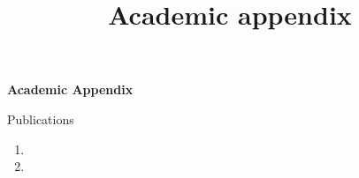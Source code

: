 \documentclass{resume} %
\begin{document}





\newpage


\title{{Academic appendix}}
\hfil{\Large{\bf Academic Appendix}}\hfil\\
\nameskip\break
\begin{rSection}{Publications}
  \begin{enumerate}
    \item {}
    \item {}
  \end{enumerate}

\end{rSection}
\end{document}
